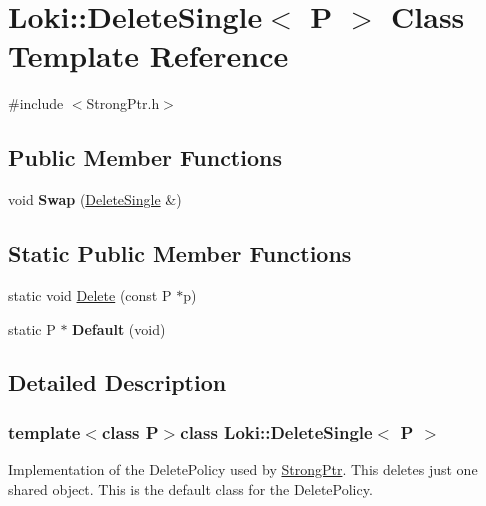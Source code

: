 \hypertarget{classLoki_1_1DeleteSingle}{}\section{Loki\+:\+:Delete\+Single$<$ P $>$ Class Template Reference}
\label{classLoki_1_1DeleteSingle}


{\ttfamily \#include $<$Strong\+Ptr.\+h$>$}

\subsection*{Public Member Functions}
\begin{DoxyCompactItemize}
\item 
\hypertarget{classLoki_1_1DeleteSingle_a57412b2e2f3ecf4578720450ebe239a5}{}void {\bfseries Swap} (\hyperlink{classLoki_1_1DeleteSingle}{Delete\+Single} \&)\label{classLoki_1_1DeleteSingle_a57412b2e2f3ecf4578720450ebe239a5}

\end{DoxyCompactItemize}
\subsection*{Static Public Member Functions}
\begin{DoxyCompactItemize}
\item 
static void \hyperlink{classLoki_1_1DeleteSingle_ad6c44662923b94ae70478b91f5034860}{Delete} (const P $\ast$p)
\item 
\hypertarget{classLoki_1_1DeleteSingle_a1021cd89294387a89a6cede25278cd77}{}static P $\ast$ {\bfseries Default} (void)\label{classLoki_1_1DeleteSingle_a1021cd89294387a89a6cede25278cd77}

\end{DoxyCompactItemize}


\subsection{Detailed Description}
\subsubsection*{template$<$class P$>$class Loki\+::\+Delete\+Single$<$ P $>$}

Implementation of the Delete\+Policy used by \hyperlink{classLoki_1_1StrongPtr}{Strong\+Ptr}. This deletes just one shared object. This is the default class for the Delete\+Policy. 

